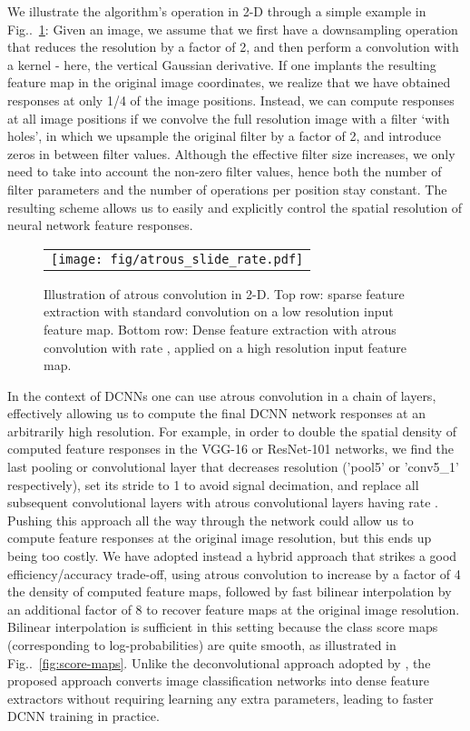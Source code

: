 \documentclass[10pt,journal,compsoc]{IEEEtran}
\makeatletter
\newcommand{\figref}[1]{Fig\onedot~\ref{#1}}
\def\onedot{\ifx\@let@token.\else.\null\fi\xspace}
\makeatother
\begin{document}
We illustrate the algorithm's operation in 2-D through a simple example in \figref{fig:hole2d}: Given an image, we 
assume that we first have a downsampling operation that reduces the resolution by a factor of 2, and then perform  a 
convolution with a  kernel - here, the vertical Gaussian derivative. If one  implants the resulting 
feature map in the original image coordinates, we realize that we have obtained responses at only 1/4 of the image positions. 
Instead, we can compute responses at all image positions 
if we convolve the full resolution image with a filter `with holes', in which 
we upsample the original filter by a
factor of 2, and introduce zeros  in between filter values. 
Although the effective filter size increases, we only need to take into account the
non-zero filter values, hence both the number of filter parameters and the number of operations per position stay constant. 
The resulting scheme allows us to easily and explicitly control the spatial resolution of neural
network feature responses.

\begin{figure}
  \centering
    \begin{tabular}{c}
\texttt{[image: fig/atrous\_slide\_rate.pdf]}
    	\vspace{-.9cm}
    \end{tabular}
   \caption{Illustration of atrous convolution in 2-D. Top row: sparse feature
   	extraction with standard convolution on a low resolution input feature map.
   	Bottom row: Dense feature extraction with atrous convolution with rate ,
   	applied on a high resolution input feature map.}
    \label{fig:hole2d}
   \end{figure}

In the context of DCNNs one can use  atrous convolution in a chain of layers,
 effectively allowing us to compute the final DCNN network responses at an
arbitrarily high resolution. For example, in order to double the spatial density
of computed feature responses in the VGG-16 or ResNet-101 networks, we find the
last pooling or convolutional layer that decreases resolution ('pool5' or 'conv5\_1'
respectively), set its stride to 1 to avoid signal decimation, and replace all
subsequent convolutional layers with atrous convolutional layers having rate
. 
Pushing this approach all the
way through the network could allow us to compute feature responses at the original image
resolution, but this ends up being too
costly. We have adopted instead a hybrid approach that strikes a
good efficiency/accuracy trade-off, using atrous convolution to increase by a
factor of 4 the density of computed feature maps, followed by fast bilinear
interpolation by an additional factor of 8 to
recover feature maps at the original image resolution. Bilinear interpolation
is sufficient in this setting because the class score maps (corresponding to
log-probabilities) are quite smooth, as illustrated in
\figref{fig:score-maps}. Unlike the deconvolutional approach adopted by
\cite{long2014fully}, the proposed approach converts image classification
networks into dense feature extractors without requiring learning any extra
parameters, leading to faster DCNN training in practice. 
\end{document}
